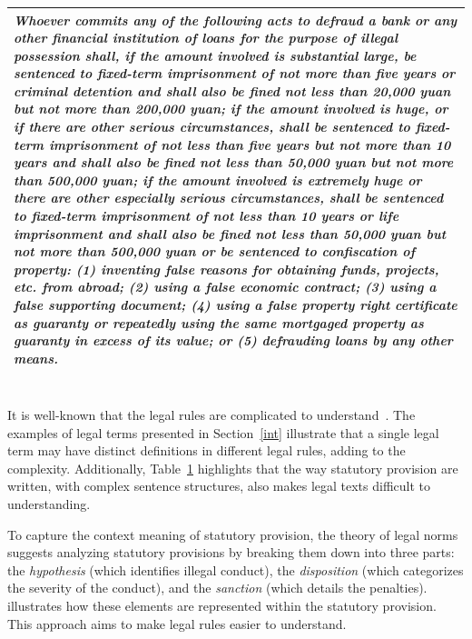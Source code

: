 \begin{table}[]
\begin{tabular}{p{}}
        \textit{{\color{brown}Whoever commits any of the following acts to defraud a bank or any other financial institution of loans for the purpose of illegal possession shall}, if {\color{blue}the amount involved is substantial large}, {\color{red}be sentenced to fixed-term imprisonment of not more than five years or criminal detention and shall also be fined not less than 20,000 yuan but not more than 200,000 yuan}; if {\color{blue}the amount involved is huge, or if there are other serious circumstances}, shall {\color{red}be sentenced to fixed-term imprisonment of not less than five years but not more than 10 years and shall also be fined not less than 50,000 yuan but not more than 500,000 yuan}; if {\color{blue}the amount involved is extremely huge or there are other especially serious circumstances}, shall {\color{red}be sentenced to fixed-term imprisonment of not less than 10 years or life imprisonment and shall also be fined not less than 50,000 yuan but not more than 500,000 yuan or be sentenced to confiscation of property}: {\color{brown}(1) inventing false reasons for obtaining funds, projects, etc. from abroad; (2) using a false economic contract; (3) using a false supporting document; (4) using a false property right certificate as guaranty or repeatedly using the same mortgaged property as guaranty in excess of its value; or (5) defrauding loans by any other means.}}\\
        \bottomrule
    \end{tabular}
    \label{tab:three}
    \vspace{-1em}
\end{table}

\section{\lawgraph{}} \label{con}
It is well-known that the legal rules are complicated to understand~\cite{zHodi2019limits}. The examples of legal terms presented in Section~\ref{int} illustrate that a single legal term may have distinct definitions in different legal rules, adding to the complexity. Additionally, Table~\ref{tab:three} highlights that the way statutory provision are written, with complex sentence structures, also makes legal texts difficult to understanding.

To capture the context meaning of statutory provision, the theory of legal norms~\cite{legalnorm,keuth1974some} suggests analyzing statutory provisions by breaking them down into three parts: the \textit{hypothesis} (which identifies illegal conduct), the \textit{disposition} (which categorizes the severity of the conduct), and the \textit{sanction} (which details the penalties).  illustrates how these elements are represented within the statutory provision. This approach aims to make legal rules easier to understand. 

